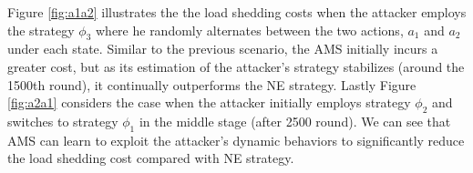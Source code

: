 Figure \ref{fig:a1a2} illustrates the the load shedding costs when the attacker employs the strategy $\phi_3$ where he randomly alternates between the two actions, $a_1$ and $a_2$ under each state. Similar to the previous scenario, the AMS initially incurs a greater cost, but as its estimation of the attacker's strategy stabilizes (around the 1500th round), it continually outperforms the NE strategy. Lastly Figure \ref{fig:a2a1} considers the case when the attacker initially employs strategy $\phi_2$ and switches to strategy $\phi_1$ in the middle stage (after 2500 round). We can see that AMS can learn to exploit the attacker's dynamic behaviors to significantly reduce the load shedding cost compared with NE strategy.

